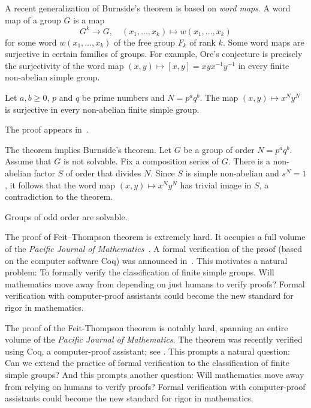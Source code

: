 A recent generalization of Burnside's theorem
is based on \emph{word maps}. A word map
of a group $G$ is a map 
\[
G^k\to G,\quad 
(x_1,\dots,x_k)\mapsto w(x_1,\dots,x_k)
\]
for some word $w(x_1,\dots,x_k)$ of the free group $F_k$ of rank $k$. 
Some word maps are surjective in certain families of groups. For example, 
Ore's conjecture is precisely the surjectivity of the word map
$(x,y)\mapsto [x,y]=xyx^{-1}y^{-1}$ in every finite non-abelian simple 
group. 

\begin{theorem}
    Let $a,b\geq0$, $p$ and $q$ be prime numbers and $N=p^aq^b$. The map 
    $(x,y)\mapsto x^Ny^N$ is surjective in every non-abelian 
    finite simple group. 
\end{theorem}

The proof appears in~\cite{MR3827208}. 

The theorem implies Burnside's theorem. Let $G$ be a group of order
$N=p^aq^b$. Assume that $G$ is not solvable. 
Fix a composition series of $G$. There is a non-abelian factor $S$ 
of order that divides $N$. Since 
$S$ is simple non-abelian and $s^N=1$, it follows that the word map
$(x,y)\mapsto x^Ny^N$ has trivial image in $S$, a contradiction 
to the theorem. 

\begin{theorem}
    Groups of odd order are solvable. 
\end{theorem}

The proof of Feit--Thompson theorem is extremely hard. 
It occupies a full volume of the 
\emph{Pacific Journal of Mathematics}~\cite{MR166261}. 
A formal verification of the proof 
(based on the computer software Coq) 
was announced in~\cite{MR3111271}.  This motivates a natural problem: To formally verify 
the classification of finite simple groups.  
Will mathematics move away from depending on just humans to verify proofs? Formal verification with computer-proof assistants 
could become the new standard for rigor in mathematics. 

The proof of the Feit-Thompson theorem is notably hard, spanning an entire volume of the \emph{Pacific Journal of Mathematics}\cite{MR166261}. The theorem was recently verified using Coq, a computer-proof assistant; see \cite{MR3111271}. 
This prompts a natural question: Can we extend the practice of formal verification to the classification of finite simple groups? And this prompts another question: Will mathematics move away from relying on humans to verify proofs? Formal verification with computer-proof assistants 
could become the new standard for rigor in mathematics. 

